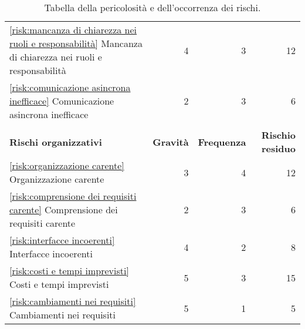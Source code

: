 \begin{table}[H]
\begin{tabular}{l|r|r|r}
		\autoref{risk:mancanza di chiarezza nei ruoli e responsabilità}
		Mancanza di chiarezza nei ruoli e responsabilità									 & 4                & 3                  & 12                        \\
		\autoref{risk:comunicazione asincrona inefficace}
		Comunicazione asincrona inefficace									 				 & 2                & 3                  & 6                        \\
		\hline
		\multicolumn{4}{l}{}                                                                                                                                    \\
		\hline
		\textbf{Rischi organizzativi}                                                        & \textbf{Gravità} & \textbf{Frequenza} & \textbf{Rischio residuo} \\
		\hline
		\autoref{risk:organizzazione carente} Organizzazione carente                         & 3                & 4                  & 12                       \\
		\autoref{risk:comprensione dei requisiti carente} Comprensione dei requisiti carente & 2                & 3                  & 6                        \\
		\autoref{risk:interfacce incoerenti} Interfacce incoerenti                           & 4                & 2                  & 8                        \\
		\autoref{risk:costi e tempi imprevisti} Costi e tempi imprevisti                     & 5                & 3                  & 15                       \\
		\autoref{risk:cambiamenti nei requisiti} Cambiamenti nei requisiti                   & 5                & 1                  & 5                        \\
		\hline
	\end{tabular}
	\caption{Tabella della pericolosità e dell'occorrenza dei rischi.}
\end{table}
